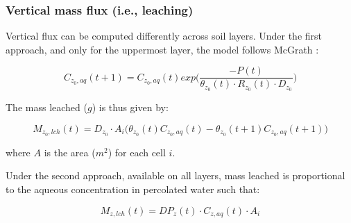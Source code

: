 \documentclass[]{article}
\begin{document}
\hypertarget{vertical-mass-flux-i.e.-leaching}{%
\subsubsection{Vertical mass flux (i.e.,
leaching)}\label{vertical-mass-flux-i.e.-leaching}}

Vertical flux can be computed differently across soil layers. Under the
first approach, and only for the uppermost layer, the model follows
McGrath \citeyearpar{Mcgrath2008}:

\begin{equation}
C_{z_0,aq}(t+1) = C_{z_0,aq}(t) exp \Big( \frac{ -P(t) }{ \theta_{z_0}(t) \cdot R_{z_0}(t) \cdot D_{z_0} } \Big) 
\label{eq:conc_mcgrath}
\end{equation}

The mass leached (\(g\)) is thus given by:

\begin{equation}
M_{z_0,lch}(t) =  D_{z_0} \cdot A_i  \Big(\theta_{z_0}(t)C_{z_0,aq}(t)- \theta_{z_0}(t+1) C_{z_0,aq}(t+1) \Big) 
\label{eq:leached_mcgrath}
\end{equation}

where \(A\) is the area (\(m^2\)) for each cell \(i\).

Under the second approach, available on all layers, mass leached is
proportional to the aqueous concentration in percolated water such that:

\begin{equation}
M_{z,lch}(t) = DP_z(t) \cdot C_{z,aq }(t) \cdot A_i
\label{eq:leached_prop}
\end{equation}
\end{document}
